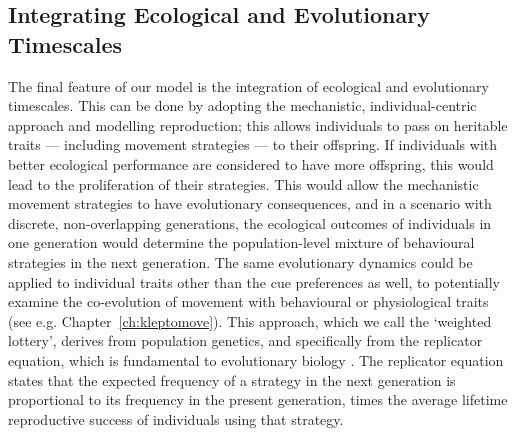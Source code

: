 \subsection*{Integrating Ecological and Evolutionary Timescales}

The final feature of our model is the integration of ecological and evolutionary timescales.
This can be done by adopting the mechanistic, individual-centric approach and modelling reproduction; this allows individuals to pass on heritable traits --- including movement strategies --- to their offspring.
If individuals with better ecological performance are considered to have more offspring, this would lead to the proliferation of their strategies.
This would allow the mechanistic movement strategies to have evolutionary consequences, and in a scenario with discrete, non-overlapping generations, the ecological outcomes of individuals in one generation would determine the population-level mixture of behavioural strategies in the next generation.
The same evolutionary dynamics could be applied to individual traits other than the cue preferences as well, to potentially examine the co-evolution of movement with behavioural or physiological traits (see e.g. Chapter~\ref{ch:kleptomove}).
This approach, which we call the `weighted lottery', derives from population genetics, and specifically from the replicator equation, which is fundamental to evolutionary biology \parencite{hofbauer1988}.
The replicator equation states that the expected frequency of a strategy in the next generation is proportional to its frequency in the present generation, times the average lifetime reproductive success of individuals using that strategy.


